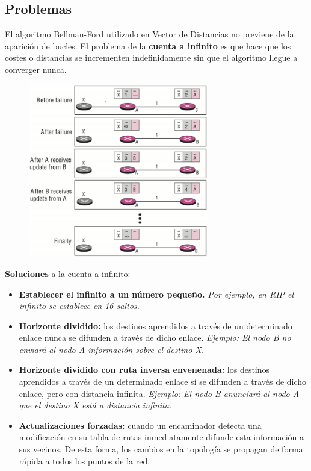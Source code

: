     \begin{onepage}
    \subsection{Problemas}
     El algoritmo Bellman-Ford utilizado en Vector de Distancias no previene de la aparición de bucles. El problema de la \textbf{cuenta a infinito} es que hace que los costes o distancias se incrementen indefinidamente sin que el algoritmo llegue a converger nunca.
    \begin{figure}[H]
    \centering \includegraphics[width=0.7\textwidth]{img/CuentaAInfinito.png}
    \end{figure}
    \textbf{Soluciones} a la cuenta a infinito:
    \begin{itemize}
        \item \textbf{Establecer el infinito a un número pequeño. }\textit{Por ejemplo, en RIP el infinito se establece en 16 saltos.}
        \item \textbf{Horizonte dividido: }los destinos aprendidos a través de un determinado enlace nunca se difunden a través de dicho enlace. \textit{Ejemplo: El nodo B no enviará al nodo A información sobre el destino X.}
        \item \textbf{Horizonte dividido con ruta inversa envenenada: }los destinos aprendidos a través de un determinado enlace sí se difunden a través de dicho enlace, pero con distancia infinita. \textit{Ejemplo: El nodo B anunciará al nodo A que el destino X está a distancia infinita.}
        \item \textbf{Actualizaciones forzadas: }cuando un encaminador detecta una modificación en su tabla de rutas inmediatamente difunde esta información a sus vecinos. De esta forma, los cambios en la topología se propagan de forma rápida a todos los puntos de la red.
    \end{itemize}
\end{onepage} 

